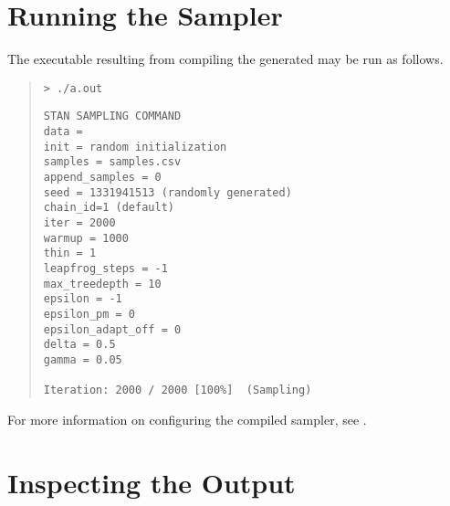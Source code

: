 \section{Running the Sampler}

The executable resulting from compiling the generated \Cpp may be run
as follows.
%
\begin{quote}
\begin{Verbatim}[fontshape=sl]
> ./a.out
\end{Verbatim}
%
\begin{Verbatim}
STAN SAMPLING COMMAND
data = 
init = random initialization
samples = samples.csv
append_samples = 0
seed = 1331941513 (randomly generated)
chain_id=1 (default)
iter = 2000
warmup = 1000
thin = 1
leapfrog_steps = -1
max_treedepth = 10
epsilon = -1
epsilon_pm = 0
epsilon_adapt_off = 0
delta = 0.5
gamma = 0.05

Iteration: 2000 / 2000 [100%]  (Sampling)
\end{Verbatim}
\end{quote}
%
For more information on configuring the compiled sampler, see
.

\section{Inspecting the Output}

